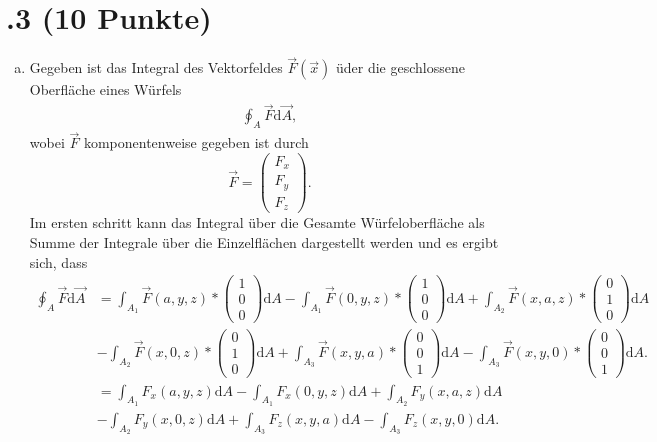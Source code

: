 \section*{\nr.3 \titthree (10 Punkte)}
\begin{enumerate}[(a)]
\item  Gegeben ist das Integral des Vektorfeldes $\vec{F}(\vec{x})$ üder die geschlossene Oberfläche eines Würfels
\begin{align}
\oint_A \vec{F}\mathrm{d}\vec{A},
\end{align}
wobei $\vec{F}$ komponentenweise gegeben ist durch
\begin{equation*}
	\vec{F} = \begin{pmatrix}F_x \\ F_y \\ F_z \end{pmatrix}.
\end{equation*}
Im ersten schritt kann das Integral über die Gesamte Würfeloberfläche als Summe der Integrale über die Einzelflächen dargestellt werden und es ergibt sich, dass 
\begin{align*}
\oint_A \vec{F}\mathrm{d}\vec{A}  &= \int_{A_{1}} \vec{F}(a,y,z)*\begin{pmatrix}1 \\ 0 \\ 0 \end{pmatrix} \mathrm{d}A - \int_{A_{1}} \vec{F}(0,y,z)*\begin{pmatrix}1 \\ 0 \\ 0 \end{pmatrix}\mathrm{d}A + \int_{A_{2}} \vec{F}(x,a,z)*\begin{pmatrix}0 \\ 1 \\ 0 \end{pmatrix}\mathrm{d}A \\ & - \int_{A_{2}} \vec{F}(x,0,z)*\begin{pmatrix}0 \\ 1 \\ 0 \end{pmatrix}\mathrm{d}A + \int_{A_{3}} \vec{F}(x,y,a)*\begin{pmatrix}0 \\ 0 \\ 1 \end{pmatrix}\mathrm{d}A - \int_{A_{3}} \vec{F}(x,y,0)*\begin{pmatrix} 0 \\ 0 \\ 1 \end{pmatrix}\mathrm{d}A.\\ & = \int_{A_{1}} F_{x}(a,y,z) \mathrm{d}A - \int_{A_{1}} F_{x}(0,y,z)\mathrm{d}A + \int_{A_{2}} F_{y}(x,a,z)\mathrm{d}A \\ & - \int_{A_{2}} F_{y}(x,0,z)\mathrm{d}A + \int_{A_{3}} F_{z}(x,y,a)\mathrm{d}A - \int_{A_{3}} F_{z}(x,y,0)\mathrm{d}A.

\end{align*}
\end{enumerate}
